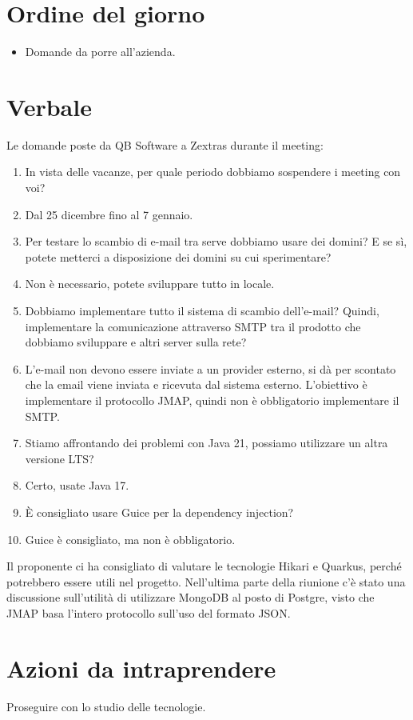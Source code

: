 \documentclass[12pt]{article}
\begin{document}
    \section{Ordine del giorno}
    \begin{itemize}
    	\item Domande da porre all'azienda.
    \end{itemize}
    
    \section{Verbale}
    Le domande poste da QB Software a Zextras durante il meeting:

    \newcommand{\answer}{\item[\textbf{A:}]}
        
        \begin{enumerate}[label=\textbf{Q\arabic*:}]
            \item In vista delle vacanze, per quale periodo dobbiamo sospendere i meeting con voi?
            \answer Dal 25 dicembre fino al 7 gennaio.

            \item Per testare lo scambio di e-mail tra serve dobbiamo usare dei domini? E se sì, potete metterci a disposizione dei domini su cui sperimentare? 
            \answer Non è necessario, potete sviluppare tutto in locale.

            \item Dobbiamo implementare tutto il sistema di scambio dell'e-mail? Quindi, implementare la comunicazione attraverso SMTP tra il prodotto che dobbiamo sviluppare e altri server sulla rete?
            \answer L'e-mail non devono essere inviate a un provider esterno, si dà per scontato che la email viene inviata e ricevuta dal sistema esterno. L'obiettivo è implementare il protocollo JMAP, quindi non è obbligatorio implementare il SMTP.
            
            \item Stiamo affrontando dei problemi con Java 21, possiamo utilizzare un altra versione LTS? 
            \answer Certo, usate Java 17.
        
            \item È consigliato usare Guice per la dependency injection?
            \answer Guice è consigliato, ma non è obbligatorio.
        \end{enumerate}

        \noindent
        Il proponente ci ha consigliato di valutare le tecnologie Hikari e Quarkus, perché potrebbero essere utili nel progetto. Nell'ultima parte della riunione c'è stato una discussione sull'utilità di utilizzare MongoDB al posto di Postgre, visto che JMAP basa l'intero protocollo sull'uso del formato JSON.
    
    \section{Azioni da intraprendere}
    Proseguire con lo studio delle tecnologie.
\end{document}
